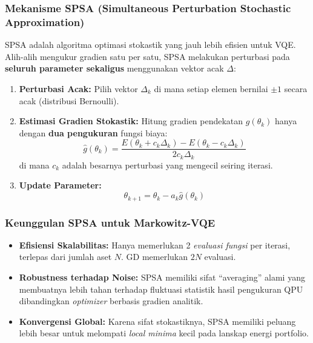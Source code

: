 \documentclass[12pt,a4paper]{article}
\providecommand{\tightlist}{%
  \setlength{\itemsep}{0pt}\setlength{\parskip}{0pt}}
\begin{document}
\hypertarget{mekanisme-spsa-simultaneous-perturbation-stochastic-approximation}{%
\subsubsection{Mekanisme SPSA (Simultaneous Perturbation Stochastic Approximation)}\label{mekanisme-spsa-simultaneous-perturbation-stochastic-approximation}}

SPSA adalah algoritma optimasi stokastik yang jauh lebih efisien untuk VQE. Alih-alih mengukur gradien satu per satu, SPSA melakukan perturbasi pada \textbf{seluruh parameter sekaligus} menggunakan vektor acak \(\Delta\):

\begin{enumerate}
\def\labelenumi{\arabic{enumi}.}
\tightlist
\item
  \textbf{Perturbasi Acak:} Pilih vektor \(\Delta_k\) di mana setiap elemen bernilai \(\pm 1\) secara acak (distribusi Bernoulli).
\item
  \textbf{Estimasi Gradien Stokastik:} Hitung gradien pendekatan \(g(\theta_k)\) hanya dengan \textbf{dua pengukuran} fungsi biaya: \[ \hat{g}(\theta_k) = \frac{E(\theta_k + c_k \Delta_k) - E(\theta_k - c_k \Delta_k)}{2 c_k \Delta_k} \] di mana \(c_k\) adalah besarnya perturbasi yang mengecil seiring iterasi.
\item
  \textbf{Update Parameter:} \[ \theta_{k+1} = \theta_k - a_k \hat{g}(\theta_k) \]
\end{enumerate}

\hypertarget{keunggulan-spsa-untuk-markowitz-vqe}{%
\subsubsection{Keunggulan SPSA untuk Markowitz-VQE}\label{keunggulan-spsa-untuk-markowitz-vqe}}

\begin{itemize}
\tightlist
\item
  \textbf{Efisiensi Skalabilitas:} Hanya memerlukan 2 \emph{evaluasi fungsi} per iterasi, terlepas dari jumlah aset \(N\). GD memerlukan \(2N\) evaluasi.
\item
  \textbf{Robustness terhadap Noise:} SPSA memiliki sifat ``averaging'' alami yang membuatnya lebih tahan terhadap fluktuasi statistik hasil pengukuran QPU dibandingkan \emph{optimizer} berbasis gradien analitik.
\item
  \textbf{Konvergensi Global:} Karena sifat stokastiknya, SPSA memiliki peluang lebih besar untuk melompati \emph{local minima} kecil pada lanskap energi portfolio.
\end{itemize}
\end{document}
